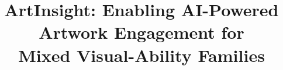 \documentclass[sigconf]{acmart}
\begin{document}
\title{ArtInsight: Enabling AI-Powered Artwork Engagement for\\ Mixed Visual-Ability Families}

\end{document}
